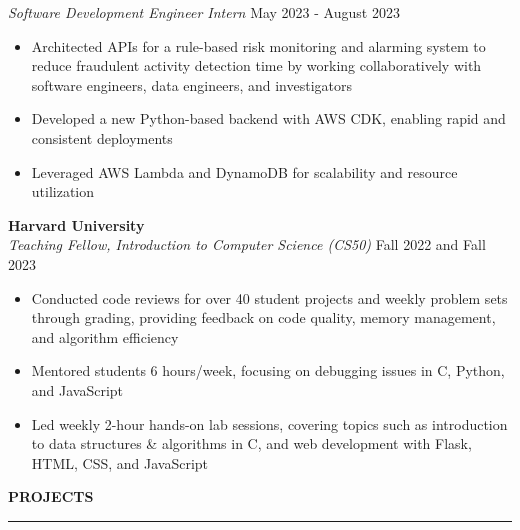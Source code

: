\documentclass[11pt,a4paper]{article}
\newcommand{\sectionheading}[1]{\vspace{0.2cm}\textbf{\Large #1}\vspace{0.1cm}\hrule\vspace{0.3cm}}
\newcommand{\subheading}[1]{\textbf{#1}}
\newcommand{\daterange}[1]{\hfill{#1}}
\begin{document}
\textit{Software Development Engineer Intern} \daterange{May 2023 - August 2023}
\begin{itemize}[leftmargin=*,nosep]
    \item Architected APIs for a rule-based risk monitoring and alarming system to reduce fraudulent activity detection time by working collaboratively with software engineers, data engineers, and investigators
    \item Developed a new Python-based backend with AWS CDK, enabling rapid and consistent deployments
    \item Leveraged AWS Lambda and DynamoDB for scalability and resource utilization
\end{itemize}


\subheading{Harvard University}\\
\textit{Teaching Fellow, Introduction to Computer Science (CS50)} \daterange{Fall 2022 and Fall 2023}
\begin{itemize}[leftmargin=*,nosep]
    \item Conducted code reviews for over 40 student projects and weekly problem sets through grading, providing feedback on code quality, memory management, and algorithm efficiency
    \item Mentored students 6 hours/week, focusing on debugging issues in C, Python, and JavaScript
    \item Led weekly 2-hour hands-on lab sessions, covering topics such as introduction to data structures \& algorithms in C, and web development with Flask, HTML, CSS, and JavaScript
\end{itemize}

\sectionheading{PROJECTS}
\end{document}
